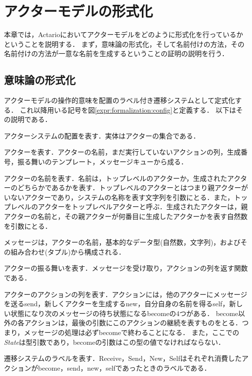 \chapter{アクターモデルの形式化}
\label{chapter:formalization}

本章では，Actarioにおいてアクターモデルをどのように形式化を行っているかということを説明する．
まず，意味論の形式化，そして名前付けの方法，その名前付けの方法が一意な名前を生成するということの証明の説明を行う．


\section{意味論の形式化}

アクターモデルの操作的意味を配置のラベル付き遷移システムとして定式化する．
これ以降用いる記号を図\ref{expr:formalization:config}と定義する．
以下はその説明である．

\begin{description}[style=nextline,leftmargin=12pt,parsep=0pt]
\item[\textit{Configuration}]
  アクターシステムの配置を表す．実体はアクターの集合である．
\item[\textit{Actor}]
  アクターを表す．アクターの名前，まだ実行していないアクションの列，生成番号，振る舞いのテンプレート，メッセージキューから成る．
\item[\textit{Name}]
  アクターの名前を表す．名前は，トップレベルのアクターか，生成されたアクターのどちらかであるかを表す．トップレベルのアクターとはつまり親アクターがいないアクターであり，システムの名称を表す文字列を引数にとる．また，トップレベルのアクターをトップレベルアクターと呼ぶ．生成されたアクターは，親アクターの名前と，その親アクターが何番目に生成したアクターかを表す自然数を引数にとる．
\item[\textit{Message}]
  メッセージは，アクターの名前，基本的なデータ型(自然数，文字列)，およびその組み合わせ(タプル)から構成される．
\item[\textit{Behavior State}]
  アクターの振る舞いを表す．メッセージを受け取り，アクションの列を返す関数である．
\item[\textit{Actions State}]
  アクターのアクションの列を表す．アクションには，他のアクターにメッセージを送る\textsf{send}，新しくアクターを生成する\textsf{new}，自分自身の名前を得る\textsf{self}，新しい状態になり次のメッセージの待ち状態になる\textsf{become}の4つがある．
  \textsf{become}以外の各アクションは，最後の引数にこのアクションの継続を表すものをとる．つまり，メッセージの処理は必ず\textsf{become}で終わることになる．
  また，ここでの\textit{State}は型引数であり，\textsf{become}の引数はこの型の値でなければならない．
\item[\textit{Label}]
  遷移システムのラベルを表す．\textsf{Receive}，\textsf{Send}，\textsf{New}，\textsf{Self}はそれぞれ消費したアクションが\textsf{become}，\textsf{send}，\textsf{new}，\textsf{self}であったときのラベルである．
\end{description}


